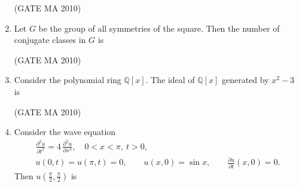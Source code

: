 \documentclass[journal,12pt,onecolumn]{IEEEtran}
\theoremstyle{remark}
\begin{document}
\begin{flushleft}
\begin{enumerate}
\hfill(GATE MA 2010)

\begin{enumerate}
\end{enumerate}

\item Let $G$ be the group of all symmetries of the square. Then the number of conjugate classes in $G$ is

\hfill(GATE MA 2010)

\begin{enumerate}
\end{enumerate}

\item Consider the polynomial ring $\mathbb{Q}[x]$. The ideal of $\mathbb{Q}[x]$ generated by $x^2-3$ is

\hfill(GATE MA 2010)

\begin{enumerate}
\end{enumerate}

\item Consider the wave equation
\begin{align*}
\frac{\partial^2 u}{\partial t^2}=4\,\frac{\partial^2 u}{\partial x^2},\quad 0<x<\pi,\ t>0,\\
u(0,t)=u(\pi,t)=0,\qquad u(x,0)=\sin x,\qquad \frac{\partial u}{\partial t}(x,0)=0.
\end{align*}
Then $u\!\left(\frac{\pi}{2},\frac{\pi}{2}\right)$ is


\end{enumerate}
\end{flushleft}
\end{document}
